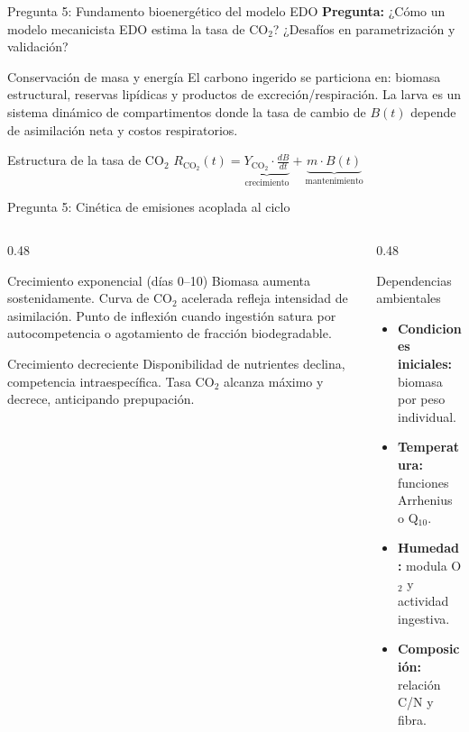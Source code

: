 \documentclass[aspectratio=169, 11pt]{beamer}
\begin{document}
\begin{frame}{Pregunta 5: Fundamento bioenergético del modelo EDO}
\textbf{Pregunta:} ¿Cómo un modelo mecanicista EDO estima la tasa de CO$_2$? ¿Desafíos en parametrización y validación?

\vspace{0.3cm}
\begin{block}{Conservación de masa y energía}
\footnotesize
El carbono ingerido se particiona en: biomasa estructural, reservas lipídicas y productos de excreción/respiración. La larva es un sistema dinámico de compartimentos donde la tasa de cambio de $B(t)$ depende de asimilación neta y costos respiratorios.
\end{block}
\begin{exampleblock}{Estructura de la tasa de CO$_2$}
\centering
$R_{\text{CO}_2}(t) = \underbrace{Y_{\text{CO}_2} \cdot \frac{dB}{dt}}_{\text{crecimiento}} + \underbrace{m \cdot B(t)}_{\text{mantenimiento}}$
\end{exampleblock}
\end{frame}

\begin{frame}{Pregunta 5: Cinética de emisiones acoplada al ciclo}
\begin{columns}[T]
\begin{column}{0.48\textwidth}
\begin{block}{Crecimiento exponencial (días 0--10)}
\footnotesize
Biomasa aumenta sostenidamente. Curva de CO$_2$ acelerada refleja intensidad de asimilación. Punto de inflexión cuando ingestión satura por autocompetencia o agotamiento de fracción biodegradable.
\end{block}
\begin{block}{Crecimiento decreciente}
\footnotesize
Disponibilidad de nutrientes declina, competencia intraespecífica. Tasa CO$_2$ alcanza máximo y decrece, anticipando prepupación.
\end{block}
\end{column}
\begin{column}{0.48\textwidth}
\begin{alertblock}{Dependencias ambientales}
\footnotesize
\begin{itemize}
    \item \textbf{Condiciones iniciales:} biomasa por peso individual.
    \item \textbf{Temperatura:} funciones Arrhenius o Q$_{10}$.
    \item \textbf{Humedad:} modula O$_2$ y actividad ingestiva.
    \item \textbf{Composición:} relación C/N y fibra.
\end{itemize}
\end{alertblock}
\end{column}
\end{columns}
\end{frame}
\end{document}
